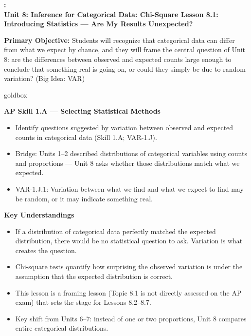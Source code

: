 \documentclass[10pt]{article}
\newcommand{\UnitNumberName}{Unit 8: Inference for Categorical Data: Chi-Square \quad}
\newcommand{\LessonNumberName}{Lesson 8.1: Introducing Statistics --- Are My Results Unexpected?}
\begin{document}
\begin{center}
    {\Large\bfseries \CourseName: \SchoolYear \\
    {\small\bfseries \UnitNumberName \LessonNumberName}}
\end{center}

\begin{tcolorbox}[colback=sky, colframe=navy, boxrule=0.9pt, arc=2mm,
    left=2mm, right=2mm, top=1.5mm, bottom=1.5mm]
    \textbf{Primary Objective:} Students will recognize that categorical data can differ
    from what we expect by chance, and they will frame the central question of Unit 8:
    are the differences between observed and expected counts large enough to conclude that
    something real is going on, or could they simply be due to random variation?
    (Big Idea: VAR)
\end{tcolorbox}

\renewcommand{\arraystretch}{1.6}
\begin{skillbox}{goldbox}
\begin{minipage}[t]{0.48\linewidth}
    \textbf{AP Skill 1.A --- Selecting Statistical Methods}
    \begin{itemize}
        \item Identify questions suggested by variation between observed and expected
              counts in categorical data (Skill 1.A; VAR-1.J).
        \item Bridge: Units 1--2 described distributions of categorical variables using
              counts and proportions --- Unit 8 asks whether those distributions match
              what we expected.
        \item VAR-1.J.1: Variation between what we find and what we expect to find may
              be random, or it may indicate something real.
    \end{itemize}
\end{minipage}
\hfill
\begin{minipage}[t]{0.48\linewidth}
    \textbf{Key Understandings}
    \begin{itemize}
        \item If a distribution of categorical data perfectly matched the expected
              distribution, there would be no statistical question to ask. Variation
              is what creates the question.
        \item Chi-square tests quantify how surprising the observed variation is under
              the assumption that the expected distribution is correct.
        \item This lesson is a framing lesson (Topic 8.1 is not directly assessed
              on the AP exam) that sets the stage for Lessons 8.2--8.7.
        \item Key shift from Units 6--7: instead of one or two proportions, Unit 8
              compares entire categorical distributions.
    \end{itemize}
\end{minipage}
\end{skillbox}
\end{document}
